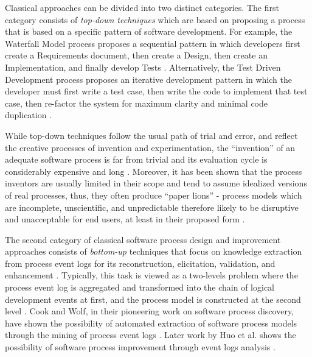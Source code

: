 Classical approaches can be divided into two distinct categories. 
The first category consists of \textit{top-down techniques} which are based on proposing a process 
that is based on a specific pattern of software development. 
For example, the Waterfall Model process proposes a sequential pattern in which developers first create a 
Requirements document, then create a Design, then create an Implementation, and finally develop Tests 
\cite{citeulike:9982731}. 
Alternatively,  the Test Driven Development process proposes an iterative development pattern in which
the developer must first write a test case, then write the code to implement that test case, then re-factor 
the system for maximum clarity and minimal code duplication \cite{Beck_TDD}. 

While top-down techniques follow the usual path of trial and error, and reflect the creative processes 
of invention and experimentation, the ``invention'' of an adequate software process is far from trivial 
and its evaluation cycle is considerably expensive and long \cite{citeulike:5043104} \cite{citeulike:1986013}.
Moreover, it has been shown that the process inventors are usually limited in their scope and tend to 
assume idealized versions of real processes, thus, they often produce ``paper lions'' - process 
models which are incomplete, unscientific, and unpredictable \cite{citeulike:13208461} therefore likely 
to be disruptive and unacceptable for end users, at least in their proposed form \cite{citeulike:9758924}.

The second category of classical software process design and improvement approaches consists of 
\textit{bottom-up} techniques that focus on knowledge extraction from process event logs for 
its reconstruction, elicitation, validation, and enhancement \cite{citeulike:12944447}. 
Typically, this task is viewed as a two-levels problem where the process event log is aggregated and 
transformed into the chain of logical development events at first, 
and the process model is constructed at the second level \cite{citeulike:2703162} \cite{citeulike:12944447}.
Cook and Wolf, in their pioneering work on software process discovery, have shown the possibility of 
automated extraction of software process models through the mining of process event logs 
\cite{citeulike:328044} \cite{citeulike:5120757} \cite{citeulike:5128143}. 
Later work by Huo et al. shows the possibility of software process improvement through event 
logs analysis \cite{citeulike:7691059} \cite{citeulike:7690766}. 

